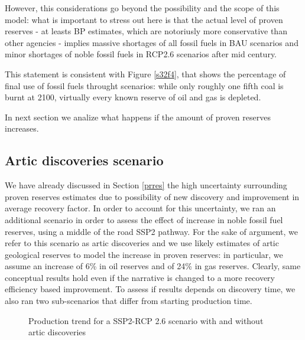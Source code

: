 \documentclass[11pt]{article} %
\begin{document}
However, this considerations go beyond the possibility and the scope of this model: what is important to stress out here is that the actual level of proven reserves - at leasts BP estimates, which are notoriusly more conservative than other agencies - implies massive shortages of all fossil fuels in BAU scenarios and minor shortages of noble fossil fuels in RCP2.6 scenarios after mid century.

This statement is consistent with Figure \ref{s32f4}, that shows the percentage of final use of fossil fuels throught scenarios: while only roughly one fifth coal is burnt at 2100, virtually every known reserve of oil and gas is depleted.

In next section we analize what happens if the amount of proven reserves increases.

\subsection{Artic discoveries scenario} \label{art}

We have already discussed in Section \ref{prres} the high uncertainty surrounding proven reserves estimates due to possibility of new discovery and improvement in average recovery factor. In order to account for this uncertainty, we ran an additional scenario in order to assess the effect of increase in noble fossil fuel reserves, using a middle of the road SSP2 pathway. For the sake of argument, we refer to this scenario as artic discoveries and we use likely estimates of artic geological reserves to model the increase in proven reserves: in particular, we assume an increase of 6\% in oil reserves and of 24\% in gas reserves. Clearly, same conceptual results hold even if the narrative is changed to a more recovery efficiency based improvement.
To assess if results depends on discovery time, we also ran two sub-scenarios that differ from starting production time. 



\begin{figure}
\centering
{} 
\caption{Production trend for a SSP2-RCP 2.6 scenario with and without artic discoveries}
\label{s32f1}
\end{figure}
\end{document}
